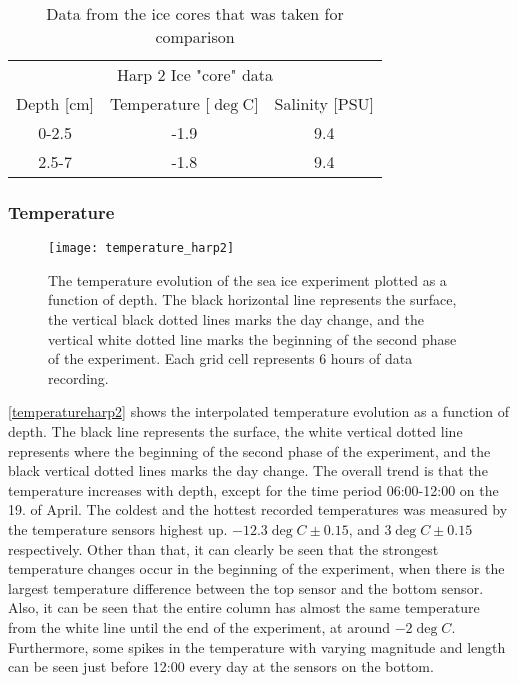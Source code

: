 \begin{table}[h!]
\centering
\caption{Data from the ice cores that was taken for comparison}
\label{Ice_core}
\begin{tabular}{ccc}
\multicolumn{3}{c}{Harp 2 Ice "core" data}                      \\
Depth {[}cm{]} & Temperature {[}$\deg$C{]} & Salinity {[}PSU{]} \\ \hline
0-2.5          & -1.9                      & 9.4                \\
2.5-7          & -1.8                      & 9.4                \\
\end{tabular}
\end{table}

\subsubsection{Temperature}
\begin{figure}[h!]
	\centering
	\texttt{[image: temperature\_harp2]}
	\caption{The temperature evolution of the sea ice experiment plotted as a function of depth. The black horizontal line represents the surface, the vertical black dotted lines marks the day change, and the vertical white dotted line marks the beginning of the second phase of the experiment. Each grid cell represents 6 hours of data recording.}
	\label{temperatureharp2}
\end{figure}

\autoref{temperatureharp2} shows the interpolated temperature evolution as a function of depth. The black line represents the surface, the white vertical dotted line represents where the beginning of the second phase of the experiment, and the black vertical dotted lines marks the day change. The overall trend is that the temperature increases with depth, except for the time period 06:00-12:00 on the 19. of April. The coldest and the hottest recorded temperatures was measured by the temperature sensors highest up. $-12.3 \deg C \pm 0.15$, and $3 \deg C \pm 0.15$ respectively. Other than that, it can clearly be seen that the strongest temperature changes occur in the beginning of the experiment, when there is the largest temperature difference between the top sensor and the bottom sensor. Also, it can be seen that the entire column has almost the same temperature from the white line until the end of the experiment, at around $-2 \deg C$. Furthermore, some spikes in the temperature with varying magnitude and length can be seen just before 12:00 every day at the sensors on the bottom. 



